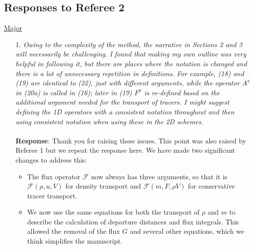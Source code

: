 \documentclass[11pt,a4paper]{article}
\begin{document}
\subsection*{Responses to Referee 2}
\underline{Major}
\begin{enumerate}[leftmargin=*]
\item[1.] \textit{Owing to the complexity of the method, the narrative in Sections 2 and 3 will necessarily be challenging. I found that making my own outline was very helpful in following it, but there are places where the notation is changed and there is a lot of unnecessary repetition in definitions.
For example, (18) and (19) are identical to (22), just with different arguments, while the operator $A^x$ in (20a) is called in (16); later in (19) $F^x$ is re-defined based on the additional argument needed for the transport of tracers. I might suggest defining the 1D operators with a consistent notation throughout and then using consistent notation when using these in the 2D schemes.} \\
\\
\textbf{Response}: Thank you for raising these issues. This point was also raised by Referee 1 but we repeat the response here. We have made two significant changes to address this:
\begin{itemize}
    \item The flux operator $\mathcal{F}$ now always has three arguments, so that it is $\mathcal{F}(\rho,u,V)$ for density transport and $\mathcal{F}(m,F,\rho V)$ for conservative tracer transport.
    \item We now use the same equations for both the transport of $\rho$ and $m$ to describe the calculation of departure distances and flux integrals. This allowed the removal of the flux $G$ and several other equations, which we think simplifies the manuscript.
\end{itemize}


\end{enumerate}
\end{document}
